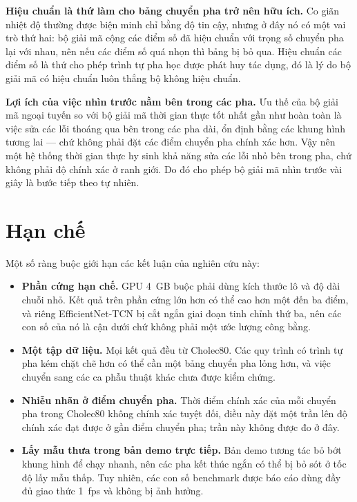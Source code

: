 \textbf{Hiệu chuẩn là thứ làm cho bảng chuyển pha trở nên hữu ích.} Co giãn nhiệt độ thường được biện minh chỉ bằng độ tin cậy, nhưng ở đây nó có một vai trò thứ hai: bộ giải mã cộng các điểm số đã hiệu chuẩn với trọng số chuyển pha lại với nhau, nên nếu các điểm số quá nhọn thì bảng bị bỏ qua. Hiệu chuẩn các điểm số là thứ cho phép trình tự pha học được phát huy tác dụng, đó là lý do bộ giải mã có hiệu chuẩn luôn thắng bộ không hiệu chuẩn.

\textbf{Lợi ích của việc nhìn trước nằm bên trong các pha.} Ưu thế của bộ giải mã ngoại tuyến so với bộ giải mã thời gian thực tốt nhất gần như hoàn toàn là việc sửa các lỗi thoáng qua bên trong các pha dài, ổn định bằng các khung hình tương lai --- chứ không phải đặt các điểm chuyển pha chính xác hơn. Vậy nên một hệ thống thời gian thực hy sinh khả năng sửa các lỗi nhỏ bên trong pha, chứ không phải độ chính xác ở ranh giới. Do đó cho phép bộ giải mã nhìn trước vài giây là bước tiếp theo tự nhiên.

\section{Hạn chế}

Một số ràng buộc giới hạn các kết luận của nghiên cứu này:

\begin{itemize}
    \item \textbf{Phần cứng hạn chế.} GPU 4~GB buộc phải dùng kích thước lô và độ dài chuỗi nhỏ. Kết quả trên phần cứng lớn hơn có thể cao hơn một đến ba điểm, và riêng EfficientNet-TCN bị cắt ngắn giai đoạn tinh chỉnh thứ ba, nên các con số của nó là cận dưới chứ không phải một ước lượng công bằng.
    \item \textbf{Một tập dữ liệu.} Mọi kết quả đều từ Cholec80. Các quy trình có trình tự pha kém chặt chẽ hơn có thể cần một bảng chuyển pha lỏng hơn, và việc chuyển sang các ca phẫu thuật khác chưa được kiểm chứng.
    \item \textbf{Nhiễu nhãn ở điểm chuyển pha.} Thời điểm chính xác của mỗi chuyển pha trong Cholec80 không chính xác tuyệt đối, điều này đặt một trần lên độ chính xác đạt được ở gần điểm chuyển pha; trần này không được đo ở đây.
    \item \textbf{Lấy mẫu thưa trong bản demo trực tiếp.} Bản demo tương tác bỏ bớt khung hình để chạy nhanh, nên các pha kết thúc ngắn có thể bị bỏ sót ở tốc độ lấy mẫu thấp. Tuy nhiên, các con số benchmark được báo cáo dùng đầy đủ giao thức 1~fps và không bị ảnh hưởng.
\end{itemize}

